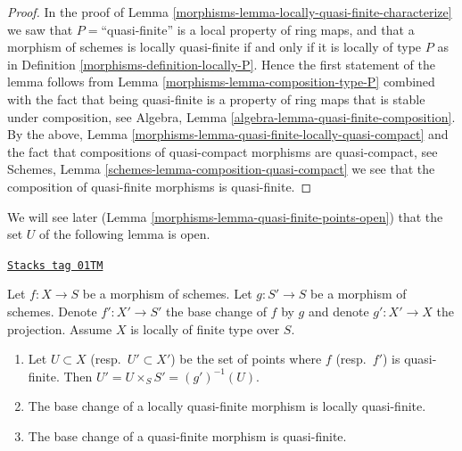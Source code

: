 \begin{proof}

In the proof of Lemma \ref{morphisms-lemma-locally-quasi-finite-characterize}
we saw that $P = $``quasi-finite'' is a local property of ring maps,
and that a morphism of schemes is locally quasi-finite if and only if
it is locally of type $P$ as in Definition \ref{morphisms-definition-locally-P}.
Hence the first statement of the lemma follows from
Lemma \ref{morphisms-lemma-composition-type-P} combined
with the fact that being quasi-finite is a property of ring maps that is
stable under composition, see
Algebra, Lemma \ref{algebra-lemma-quasi-finite-composition}.
By the above, Lemma \ref{morphisms-lemma-quasi-finite-locally-quasi-compact}
and the fact that compositions of
quasi-compact morphisms are quasi-compact, see
Schemes, Lemma \ref{schemes-lemma-composition-quasi-compact}
we see that the composition of quasi-finite morphisms is
quasi-finite.
\end{proof}

We will see later (Lemma \ref{morphisms-lemma-quasi-finite-points-open})
that the set $U$ of the following lemma is open.

\begin{lemma}
\label{morphisms-lemma-base-change-quasi-finite}
\href{https://stacks.math.columbia.edu/tag/01TM}{\texttt{Stacks tag 01TM}}


Let $f : X \to S$ be a morphism of schemes.
Let $g : S' \to S$ be a morphism of schemes.
Denote $f' : X' \to S'$ the base change of $f$ by $g$
and denote $g' : X' \to X$ the projection.
Assume $X$ is locally of finite type over $S$.
\begin{enumerate}
\item Let $U \subset X$ (resp.\ $U' \subset X'$)
be the set of points where $f$ (resp.\ $f'$) is quasi-finite.
Then $U' = U \times_S S' = (g')^{-1}(U)$.
\item The base change of a locally quasi-finite morphism is
locally quasi-finite.
\item The base change of a quasi-finite morphism is
quasi-finite.
\end{enumerate}
\end{lemma}

